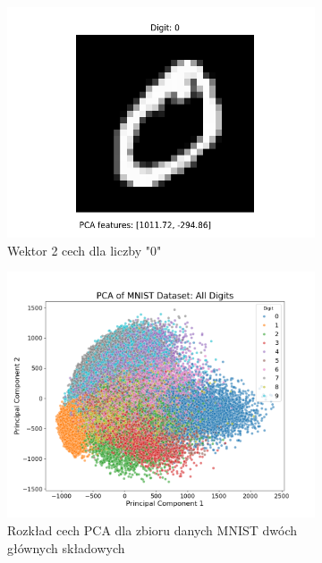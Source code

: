 \documentclass[10pt]{article}
\begin{document}
\begin{figure}[H]
\begin{subfigure}{0.16\textwidth}
        \includegraphics[width=\linewidth]{img/PCA/PCA_0}
        \caption{Wektor 2 cech dla liczby "0"}
    \end{subfigure}
    \hfill
    \begin{subfigure}{0.24\textwidth}
        \includegraphics[width=\linewidth]{img/PCA/PCA_distribution}
        \caption{Rozkład cech PCA dla zbioru danych MNIST dwóch głównych składowych}\label{fig:pca-embed}
    \end{subfigure}
    \hfill
    \begin{subfigure}{0.24\textwidth}

\end{subfigure}
\end{figure}
\end{document}
